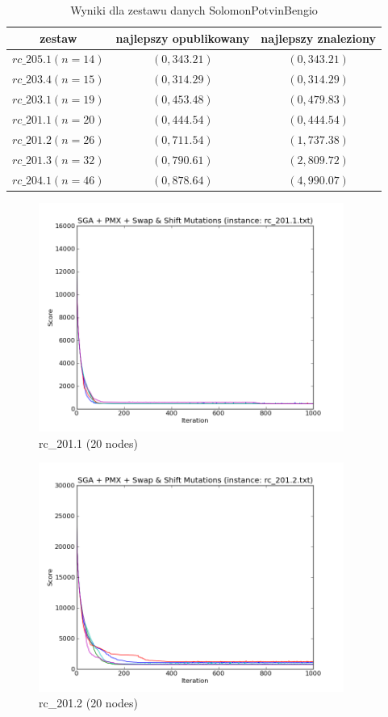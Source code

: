 \begin{frame}
\begin{table}
\centering
\caption{Wyniki dla zestawu danych SolomonPotvinBengio}
\begin{tabular}{c|c|c}
zestaw & najlepszy opublikowany & najlepszy znaleziony \\ \hline
$rc\_205.1 (n=14)$ & $(0, 343.21)$ & $(0, 343.21)$ \\
$rc\_203.4 (n=15)$ & $(0, 314.29)$ & $(0, 314.29)$ \\
$rc\_203.1 (n=19)$ & $(0, 453.48)$ & $(0, 479.83)$ \\
$rc\_201.1 (n=20)$ & $(0, 444.54)$ & $(0, 444.54)$ \\
$rc\_201.2 (n=26)$ & $(0, 711.54)$ & $(1, 737.38)$ \\
$rc\_201.3 (n=32)$ & $(0, 790.61)$ & $(2, 809.72)$ \\
$rc\_204.1 (n=46)$ & $(0, 878.64)$ & $(4, 990.07)$ 
\end{tabular}
\end{table}
\end{frame}

\begin{frame}
    \begin{figure}
        \centering
        \includegraphics[width=10cm]{charts/rc_201_1.png}
        \caption{rc\_201.1 (20 nodes)}
    \end{figure}
\end{frame}

\begin{frame}
    \begin{figure}
        \centering
        \includegraphics[width=10cm]{charts/rc_201_2.png}
        \caption{rc\_201.2 (20 nodes)}
    \end{figure}
\end{frame}



